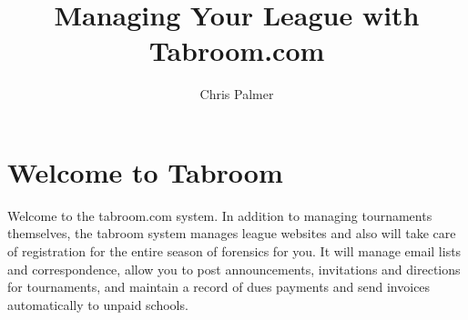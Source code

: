 \documentclass[12pt]{report}
\author{Chris Palmer}
\begin{document}
\normalsize

\title{Managing Your League with Tabroom.com}
\maketitle

\date

\tableofcontents


\newpage

\chapter{Welcome to Tabroom}

Welcome to the tabroom.com system.  In addition to managing tournaments themselves, the tabroom system manages league websites and also will take care of registration for the entire season of forensics for you.    It will manage email lists and correspondence, allow you to post announcements, invitations and directions for tournaments, and maintain a record of dues payments and send invoices automatically to unpaid schools.   
\end{document}
